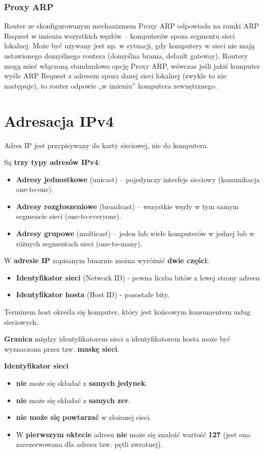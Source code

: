 \documentclass[a4paper]{article}
\begin{document}
\subsubsection{Proxy ARP}
Router ze skonfigurowanym mechanizmem Proxy ARP odpowiada na ramki ARP Request w
imieniu wszystkich węzłów – komputerów spoza segmentu sieci lokalnej. Może
być używany jest np. w sytuacji, gdy komputery w sieci nie mają ustawionego domyślnego
routera (domyślna brama, default gateway). Routery mogą mieć włączoną standardowo
opcję Proxy ARP, wówczas jeśli jakiś komputer wyśle ARP Request z adresem spoza danej
sieci lokalnej (zwykle to nie następuje), to router odpowie „w imieniu” komputera
zewnętrznego.


\section{Adresacja IPv4}
Adres IP jest przypisywany do karty sieciowej, nie do komputera.

Są \textbf{trzy typy adresów IPv4}:
\begin{itemize}
    \item \textbf{Adresy jednostkowe} (unicast) – pojedynczy interfejs sieciowy (komunikacja one-to-one).
    \item \textbf{Adresy rozgłoszeniowe} (broadcast) – wszystkie węzły w tym samym segmencie sieci (one-to-everyone).
    \item \textbf{Adresy grupowe} (multicast) – jeden lub wiele komputerów w jednej lub w różnych segmentach sieci (one-to-many).
\end{itemize}

W \textbf{adresie IP} zapisanym binarnie można wyróżnić \textbf{dwie części}:
\begin{itemize}
    \item \textbf{Identyfikator sieci} (Network ID) - pewna liczba bitów z lewej strony adresu
    \item \textbf{Identyfikator hosta} (Host ID) - pozostałe bity.
\end{itemize}
Terminem host określa się komputer, który jest końcowym konsumentem usług sieciowych.

\textbf{Granica} między identyfikatorem sieci a identyfikatorem hosta może być wyznaczona przez
tzw. \textbf{maskę sieci}.

\textbf{Identyfikator sieci}
\begin{itemize}
    \item \textbf{nie} może się składać z \textbf{samych jedynek}.
    \item \textbf{nie} może się składać z \textbf{samych zer}.
    \item \textbf{nie może się powtarzać} w złożonej sieci.
    \item W \textbf{pierwszym oktecie} adresu \textbf{nie} może się znaleźć wartość \textbf{127} (jest ona zarezerwowana dla adresu tzw. pętli zwrotnej).
\end{itemize}
\end{document}
